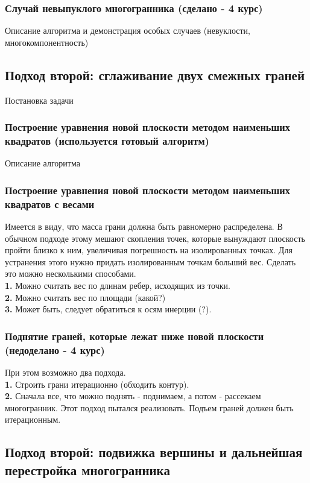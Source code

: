 \documentclass[a4paper,12pt, titlepage]{article}
\begin{document}
\subsubsection{Случай невыпуклого многогранника (сделано - 4 курс)}
Описание алгоритма и демонстрация особых случаев (невуклости, многокомпонентность)

\subsection{Подход второй: сглаживание двух смежных граней}
Постановка задачи
\subsubsection{Построение уравнения новой плоскости методом наименьших квадратов (используется готовый алгоритм)}
Описание алгоритма
\subsubsection{Построение уравнения новой плоскости методом наименьших квадратов с весами}
Имеется в виду, что масса грани должна быть равномерно распределена. В обычном подходе этому
мешают скопления точек, которые вынуждают плоскость пройти близко к ним, увеличивая погрешность
на изолированных точках. Для устранения этого нужно придать изолированным точкам больший вес.
Сделать это можно несколькими способами. \\
	\textbf{1. }Можно считать вес по длинам ребер, исходящих из точки.\\
	\textbf{2. }Можно считать вес по площади (какой?)\\
	\textbf{3. }Может быть, следует обратиться к осям инерции (?).
\subsubsection{Поднятие граней, которые лежат ниже новой плоскости (недоделано - 4 курс)}
При этом возможно два подхода.\\
	\textbf{1. }Строить грани итерационно (обходить контур).\\
	\textbf{2. }Сначала все, что можно поднять - поднимаем, а потом - рассекаем многогранник. Этот подход 
пытался реализовать. Подъем граней должен быть итерационным.

\subsection{Подход второй: подвижка вершины и дальнейшая перестройка многогранника}
\end{document}

